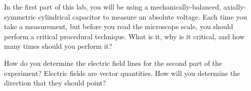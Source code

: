 \documentclass[addpoints]{physlabs}
\date{\today}
\begin{document}
\maketitle

\begin{prelab}

    \filbreak
    \question[1] In the first part of this lab, you will be using a mechanically-balanced, axially-symmetric cylindrical capacitor to measure an absolute voltage. Each time you take a measurement, but before you read the microscope scale, you should perform a critical procedural technique.  What is it, why is it critical, and how many times should you perform it?
    \begin{solution}[5cm]
        
    \end{solution}

    \filbreak
    \question[1] How do you determine the electric field lines for the second part of the experiment? Electric fields are vector quantities.  How will you determine the direction that they should point?
    \begin{solution}[5cm]
        
    \end{solution}

\end{prelab}
\end{document}
